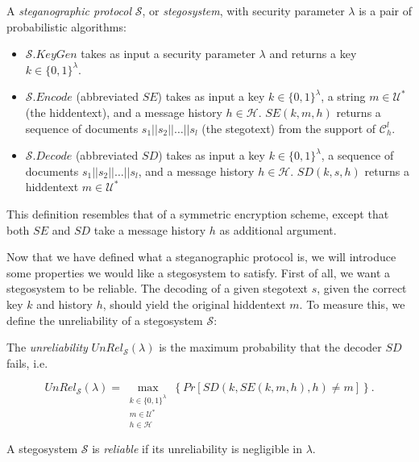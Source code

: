 \begin{definition}
\label{def:stegosystem}
A \emph{steganographic protocol} $\mathcal{S}$, or \emph{stegosystem}, with security parameter $\lambda$ is a pair of probabilistic algorithms:

\begin{itemize}
  \item $\mathcal{S}.KeyGen$ takes as input a security parameter $\lambda$ and returns a key $k \in \{0,1\}^\lambda$.
  \item $\mathcal{S}.Encode$ (abbreviated $SE$) takes as input a key $k \in \{0,1\}^\lambda$, a string $m \in \mathcal{U}^*$ (the hiddentext), and a message history $h \in \mathcal{H}$.
    $SE(k, m, h)$ returns a sequence of documents $s_1||s_2||\dots||s_l$ (the stegotext) from the support of $\mathcal{C}_h^l$.
  \item $\mathcal{S}.Decode$ (abbreviated $SD$) takes as input a key $k \in \{0,1\}^\lambda$, a sequence of documents $s_1||s_2||\dots||s_l$, and a message history $h \in \mathcal{H}$.
    $SD(k, s, h)$ returns a hiddentext $m \in \mathcal{U}^*$
\end{itemize}
\end{definition}

This definition resembles that of a symmetric encryption scheme, except that both $SE$ and $SD$ take a message history $h$ as additional argument.

Now that we have defined what a steganographic protocol is, we will introduce some properties we would like a stegosystem to satisfy.
First of all, we want a stegosystem to be reliable.
The decoding of a given stegotext $s$, given the correct key $k$ and history $h$, should yield the original hiddentext $m$.
To measure this, we define the unreliability of a stegosystem $\mathcal{S}$:

\begin{definition}
\label{def:unreliability}
The \emph{unreliability} $UnRel_{\mathcal{S}}(\lambda)$ is the maximum probability that the decoder $SD$ fails, i.e.	

$$UnRel_{\mathcal{S}}(\lambda) = \max_{\substack{k \in \{0,1\}^\lambda\\m \in \mathcal{U}^*\\ h \in \mathcal{H}}}\left\{ Pr[SD(k, SE(k,m,h), h) \neq m] \right\}.$$
\end{definition}

\begin{definition}[Reliability]
\label{def:reliability}
A stegosystem $\mathcal{S}$ is \emph{reliable} if its unreliability is negligible in $\lambda$.
\end{definition}

